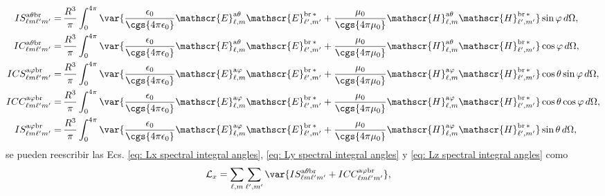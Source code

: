 \begin{align}
IS_{\ell m \ell^{\prime} m^{\prime}}^{\rm a \theta b r} 
=& \, \frac{R^3}{\pi} \int_{0}^{4\pi} \var{\frac{\epsilon_0}{\cgs{4\pi\epsilon_0}}\mathscr{E}_{\ell, m}^{\text{a}\theta}\mathscr{E}_{\ell^{\prime}, m^{\prime}}^{\text{br}\,*} + \frac{\mu_0}{\cgs{4\pi\mu_0}}\mathscr{H}_{\ell, m}^{\text{a}\theta}\mathscr{H}_{\ell^{\prime}, m^{\prime}}^{\text{br}\,*} } \sin\varphi \, d\Omega ,
\\
%
%
%
IC_{\ell m \ell^{\prime} m^{\prime}}^{\rm a \theta b r} 
=& \, \frac{R^3}{\pi} \int_{0}^{4\pi} \var{\frac{\epsilon_0}{\cgs{4\pi\epsilon_0}}\mathscr{E}_{\ell, m}^{\text{a}\theta}\mathscr{E}_{\ell^{\prime}, m^{\prime}}^{\text{br}\,*} + \frac{\mu_0}{\cgs{4\pi\mu_0}}\mathscr{H}_{\ell, m}^{\text{a}\theta}\mathscr{H}_{\ell^{\prime}, m^{\prime}}^{\text{br}\,*} } \cos\varphi \, d\Omega,\\
%
%
% 
ICS_{\ell m \ell^{\prime} m^{\prime}}^{\rm a \varphi b r}
=& \, \frac{R^3}{\pi} \int_0^{4\pi} \var{ \frac{\epsilon_0}{\cgs{4\pi\epsilon_0}} \mathscr{E}_{\ell, m}^{\text{a}\varphi}\mathscr{E}_{\ell^{\prime}, m^{\prime}}^{\text{br}\,*} + \frac{\mu_0}{\cgs{4\pi\mu_0}} \mathscr{H}_{\ell, m}^{\text{a}\varphi}\mathscr{H}_{\ell^{\prime}, m^{\prime}}^{\text{br}\,*}}\cos\theta\sin\varphi \, d\Omega,  \\
%
%
%
ICC_{\ell m \ell^{\prime} m^{\prime}}^{\rm a \varphi b r}
 =& \, \frac{R^3}{\pi} \int_0^{4\pi}\var{\frac{\epsilon_0}{\cgs{4\pi\epsilon_0}}\mathscr{E}_{\ell, m}^{\text{a}\varphi}\mathscr{E}_{\ell^{\prime}, m^{\prime}}^{\text{br}\,*} + \frac{\mu_0}{\cgs{4\pi\mu_0}}\mathscr{H}_{\ell, m}^{\text{a}\varphi}\mathscr{H}_{\ell^{\prime}, m^{\prime}}^{\text{br}\,*}}\cos\theta\cos\varphi \, d\Omega, \\
%
%
%
IS_{\ell m \ell^{\prime} m^{\prime}}^{\rm a \varphi b r}
 =& \, \frac{R^3}{\pi} \int_0^{4\pi}\var{\frac{\epsilon_0}{\cgs{4\pi\epsilon_0}}\mathscr{E}_{\ell, m}^{\text{a}\varphi}\mathscr{E}_{\ell^{\prime}, m^{\prime}}^{\text{br}\,*} + \frac{\mu_0}{\cgs{4\pi\mu_0}}\mathscr{H}_{\ell, m}^{\text{a}\varphi}\mathscr{H}_{\ell^{\prime}, m^{\prime}}^{\text{br}\,*}}\sin\theta \, d\Omega ,
\end{align}
\vspace{-0.3 cm}
se pueden reescribir las Ecs. \eqref{eq: Lx spectral integral angles}, \eqref{eq: Ly spectral integral angles} y \eqref{eq: Lz spectral integral angles} como 
%
\begin{align}
\mathcal{L}_x &= 
\sum_{\ell, m} \sum_{\ell^{\prime}, m^{\prime}} 
\var{IS_{\ell m \ell^{\prime} m^{\prime}}^{\rm a \theta b r} + 
ICC_{\ell m \ell^{\prime} m^{\prime}}^{\rm a \varphi b r}}, \label{eq: Lx spectral integral angles solved}
% 
\end{align}
